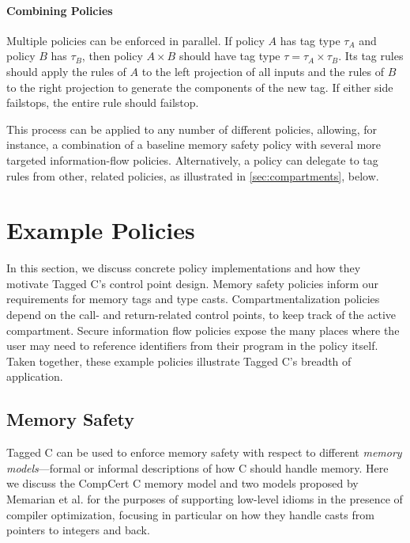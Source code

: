 \documentclass{llncs}
\begin{document}
\paragraph{Combining Policies}

Multiple policies can be enforced in parallel. If policy \(A\) has tag type \(\tau_A\)
and policy \(B\) has \(\tau_B\), then policy \(A \times B\) should have tag type
\(\tau = \tau_A \times \tau_B\). Its tag rules should apply the rules of \(A\) to
the left projection of all inputs and the rules of \(B\) to the right projection
to generate the components of the new tag. If either side failstops, the entire
rule should failstop.

This process can be applied to any number of different policies, allowing, for instance,
a combination of a baseline memory safety policy with several more targeted
information-flow policies. Alternatively, a policy can delegate to tag rules
from other, related policies, as illustrated in \cref{sec:compartments}, below.

\section{Example Policies}
\label{sec:policies}

In this section, we discuss concrete policy implementations and how 
they motivate Tagged C's control point design. Memory safety policies
inform our requirements for memory tags and type casts. Compartmentalization
policies depend on the call- and return-related control points, to keep track of the
active compartment. Secure information flow policies expose the many places
where the user may need to reference identifiers from their program in the policy itself.
Taken together, these example policies illustrate Tagged C's breadth of application.

\subsection{Memory Safety}
\label{sec:memsafe}

Tagged C can be used to enforce memory safety with respect to different {\em memory models}---formal
or informal descriptions of how C should handle memory. Here we discuss the CompCert C
memory model and two models proposed by Memarian et al. \cite{Memarian19:ExploringCSemantics}
for the purposes of supporting low-level idioms in the presence of compiler optimization, focusing in particular on how they handle
casts from pointers to integers and back.
\end{document}
